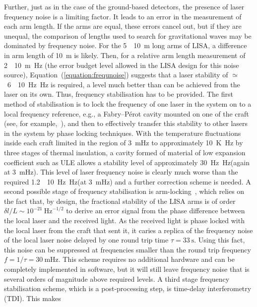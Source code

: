 \documentclass{article}
\newcommand{\Hz}{Hz\super{-1/2}\xspace}
\newcommand{\HzHz}{Hz~Hz\super{-1/2}\xspace}
\begin{document}
Further, just as in the case of the ground-based detectors, the presence of
laser frequency noise is a limiting factor. It leads to an error in the
measurement of each arm length. If the arms are equal, these errors cancel out,
but if they are unequal, the comparison of lengths used to search for
gravitational waves may be dominated by frequency noise. For the 5~\texttimes~10~m
long arms of LISA, a difference in arm length of 10~m is likely. Then, for a
relative arm length measurement of 2~\texttimes~10~m~Hz
(the error budget level allowed in the LISA design for this noise source),
Equation~(\ref{equation:frequnoise}) suggests that a laser stability
of $\simeq$~6~\texttimes~10~\HzHz is required, a level much
better than can be achieved from the laser on its own. Thus, frequency stabilisation has
to be provided. The first method of stabilisation is to lock the frequency of
one laser in the system on to a local frequency reference, e.g., a Fabry--P\'{e}rot
cavity mounted on one of the craft (see, for example,~\cite{McNamara}), and then
to effectively transfer this stability to other lasers in the system by phase
locking techniques. With the temperature fluctuations inside each craft limited
in the region of 3~mHz to approximately 10~K~\Hz by
three stages of thermal insulation, a cavity formed of material of low expansion
coefficient such as ULE allows a stability level of approximately
30~\HzHz (again at 3~mHz). This level of laser
frequency noise is clearly much worse than the required
1.2~\texttimes~10~\HzHz (at 3~mHz) and a further correction
scheme is needed. A second possible stage of frequency stabilisation
is arm-locking~\cite{Sheard:2003}, which relies on the fact that, by
design, the fractional stability of the LISA arms is of order
$\delta{}l/L \sim 10^{-21} \mathrm{\ Hz}^{-1/2}$ to derive an error
signal from the phase difference between the local laser and the
received light. As the received light is phase locked with the local
laser from the craft that sent it, it caries a replica of the frequency
noise of the local laser noise delayed by one round trip time $\tau =
33\mathrm{\ s}$. Using this fact, this noise can be suppressed at
frequencies smaller than the round trip frequency $f= 1/\tau =
30\mathrm{\ mHz}$. This scheme requires no additional hardware and can
be completely implemented in software, but it will still leave
frequency noise that is several orders of magnitude above required
levels. A third stage frequency stabilisation scheme, which is a
post-processing step, is time-delay interferometry (TDI). This makes
\end{document}
